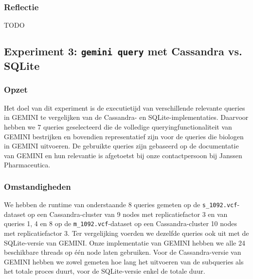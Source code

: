 \subsubsection{Reflectie}

{\color{red} \huge{TODO}}

\subsection{Experiment 3: \texttt{gemini query} met Cassandra vs. SQLite}
\label{exp3}

\subsubsection{Opzet}
Het doel van dit experiment is de executietijd van verschillende relevante queries in GEMINI te vergelijken van de Cassandra- en SQLite-implementaties. Daarvoor hebben we 7 queries geselecteerd die de volledige queryingfunctionaliteit van GEMINI bestrijken en bovendien representatief zijn voor de queries die biologen in GEMINI uitvoeren. De gebruikte queries zijn gebaseerd op de documentatie van GEMINI en hun relevantie is afgetoetst bij onze contactpersoon bij Janssen Pharmaceutica.

\subsubsection{Omstandigheden}

We hebben de runtime van onderstaande 8 queries gemeten op de \texttt{s\_1092.vcf}-dataset op een Cassandra-cluster van 9 nodes met replicatiefactor 3 en van queries 1, 4 en 8 op de \texttt{m\_1092.vcf}-dataset op een Cassandra-cluster 10 nodes met replicatiefactor 3. Ter vergelijking voerden we dezelfde queries ook uit met de SQLite-versie van GEMINI. Onze implementatie van GEMINI hebben we alle 24 beschikbare threads op \'e\'en node laten gebruiken. Voor de Cassandra-versie van GEMINI hebben we zowel gemeten hoe lang het uitvoeren van de subqueries als het totale proces duurt, voor de SQLite-versie enkel de totale duur.

